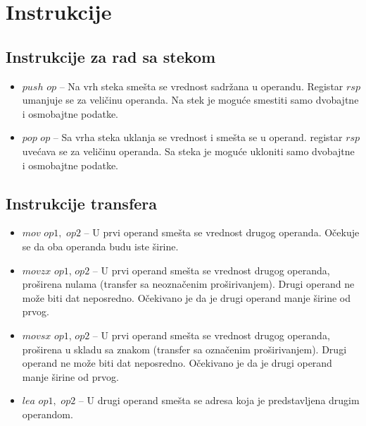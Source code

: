 \documentclass[a4paper, 10pt]{article}
\begin{document}
\section{Instrukcije}
	\subsection{Instrukcije za rad sa stekom}
		\begin{itemize}
			\item $push$ $op$ -- Na vrh steka smešta se vrednost sadržana u operandu. Registar $rsp$ umanjuje se za veličinu operanda. Na stek je moguće smestiti samo dvobajtne i osmobajtne podatke.
		 \item $pop$ $op$ -- Sa vrha steka uklanja se vrednost i smešta se u operand. registar $rsp$ uvećava se za veličinu operanda. Sa steka je moguće ukloniti samo dvobajtne i osmobajtne podatke. 
		 \end{itemize}
	\subsection{Instrukcije transfera}
		\begin{itemize}
			\item $mov$ $op1,$ $op2$ -- U prvi operand smešta se vrednost drugog operanda. Očekuje se da oba operanda budu iste širine.
			\item $movzx$ $op1$, $op2$ -- U prvi operand smešta se vrednost drugog operanda, proširena nulama (transfer sa neoznačenim proširivanjem). Drugi operand ne može biti dat neposredno. Očekivano je da je drugi operand manje širine od prvog.
			\item $movsx$ $op1$, $op2$ -- U prvi operand smešta se vrednost drugog operanda, proširena u skladu sa znakom (transfer sa označenim proširivanjem).  Drugi operand ne može biti dat neposredno. Očekivano je da je drugi operand manje širine od prvog.
			\item $lea$ $op1,$ $op2$ -- U drugi operand smešta se adresa koja je predstavljena drugim operandom.
		\end{itemize}
\end{document}

